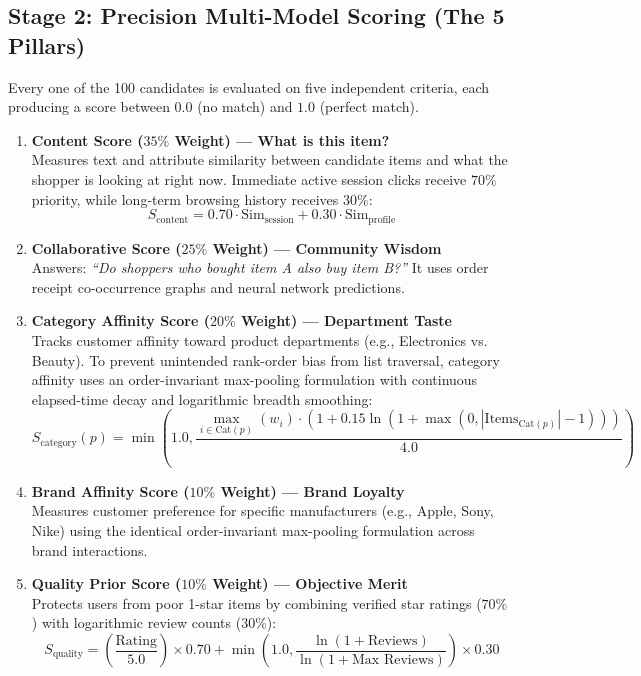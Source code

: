 \documentclass[11pt,a4paper]{article}
\begin{document}
\subsection{Stage 2: Precision Multi-Model Scoring (The 5 Pillars)}
Every one of the 100 candidates is evaluated on five independent criteria, each producing a score between $0.0$ (no match) and $1.0$ (perfect match).

\begin{enumerate}
    \item \textbf{Content Score ($35\%$ Weight) --- What is this item?}\\
    Measures text and attribute similarity between candidate items and what the shopper is looking at right now. Immediate active session clicks receive $70\%$ priority, while long-term browsing history receives $30\%$:
    \begin{equation}
        S_{\text{content}} = 0.70 \cdot \text{Sim}_{\text{session}} + 0.30 \cdot \text{Sim}_{\text{profile}}
    \end{equation}

    \item \textbf{Collaborative Score ($25\%$ Weight) --- Community Wisdom}\\
    Answers: \textit{``Do shoppers who bought item A also buy item B?''} It uses order receipt co-occurrence graphs and neural network predictions.

    \item \textbf{Category Affinity Score ($20\%$ Weight) --- Department Taste}\\
    Tracks customer affinity toward product departments (e.g., Electronics vs. Beauty). To prevent unintended rank-order bias from list traversal, category affinity uses an order-invariant max-pooling formulation with continuous elapsed-time decay and logarithmic breadth smoothing:
    \begin{equation}
        S_{\text{category}}(p) = \min\left(1.0, \frac{\max_{i \in \text{Cat}(p)}(w_i) \cdot (1 + 0.15 \ln(1 + \max(0, |\text{Items}_{\text{Cat}(p)}| - 1)))}{4.0}\right)
    \end{equation}

    \item \textbf{Brand Affinity Score ($10\%$ Weight) --- Brand Loyalty}\\
    Measures customer preference for specific manufacturers (e.g., Apple, Sony, Nike) using the identical order-invariant max-pooling formulation across brand interactions.

    \item \textbf{Quality Prior Score ($10\%$ Weight) --- Objective Merit}\\
    Protects users from poor 1-star items by combining verified star ratings ($70\%$) with logarithmic review counts ($30\%$):
    \begin{equation}
        S_{\text{quality}} = \left(\frac{\text{Rating}}{5.0}\right) \times 0.70 + \min\left(1.0, \frac{\ln(1 + \text{Reviews})}{\ln(1 + \text{Max Reviews})}\right) \times 0.30
    \end{equation}
\end{enumerate}
\end{document}
